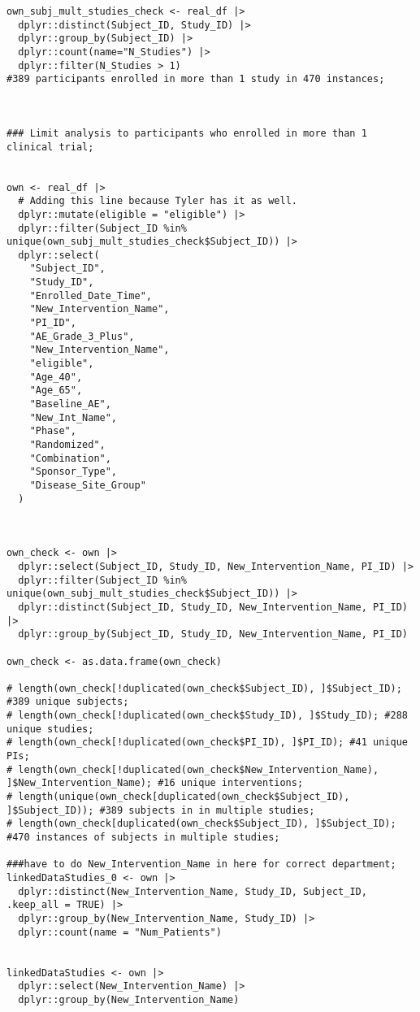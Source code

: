\begin{verbatim}
own_subj_mult_studies_check <- real_df |>
  dplyr::distinct(Subject_ID, Study_ID) |>
  dplyr::group_by(Subject_ID) |>
  dplyr::count(name="N_Studies") |>
  dplyr::filter(N_Studies > 1)
#389 participants enrolled in more than 1 study in 470 instances;



### Limit analysis to participants who enrolled in more than 1 clinical trial;


own <- real_df |>
  # Adding this line because Tyler has it as well. 
  dplyr::mutate(eligible = "eligible") |>
  dplyr::filter(Subject_ID %in% unique(own_subj_mult_studies_check$Subject_ID)) |>
  dplyr::select(
    "Subject_ID",
    "Study_ID",
    "Enrolled_Date_Time",
    "New_Intervention_Name",
    "PI_ID",
    "AE_Grade_3_Plus",
    "New_Intervention_Name",
    "eligible",
    "Age_40",
    "Age_65",
    "Baseline_AE",
    "New_Int_Name",
    "Phase",
    "Randomized",
    "Combination",
    "Sponsor_Type",
    "Disease_Site_Group"
  )



own_check <- own |>
  dplyr::select(Subject_ID, Study_ID, New_Intervention_Name, PI_ID) |>
  dplyr::filter(Subject_ID %in% unique(own_subj_mult_studies_check$Subject_ID)) |>
  dplyr::distinct(Subject_ID, Study_ID, New_Intervention_Name, PI_ID) |>
  dplyr::group_by(Subject_ID, Study_ID, New_Intervention_Name, PI_ID)

own_check <- as.data.frame(own_check)

# length(own_check[!duplicated(own_check$Subject_ID), ]$Subject_ID); #389 unique subjects;
# length(own_check[!duplicated(own_check$Study_ID), ]$Study_ID); #288 unique studies;
# length(own_check[!duplicated(own_check$PI_ID), ]$PI_ID); #41 unique PIs;
# length(own_check[!duplicated(own_check$New_Intervention_Name), ]$New_Intervention_Name); #16 unique interventions;
# length(unique(own_check[duplicated(own_check$Subject_ID), ]$Subject_ID)); #389 subjects in in multiple studies;
# length(own_check[duplicated(own_check$Subject_ID), ]$Subject_ID); #470 instances of subjects in multiple studies;

###have to do New_Intervention_Name in here for correct department;
linkedDataStudies_0 <- own |>
  dplyr::distinct(New_Intervention_Name, Study_ID, Subject_ID, .keep_all = TRUE) |>
  dplyr::group_by(New_Intervention_Name, Study_ID) |>
  dplyr::count(name = "Num_Patients")


linkedDataStudies <- own |>
  dplyr::select(New_Intervention_Name) |>
  dplyr::group_by(New_Intervention_Name)


\end{verbatim}
